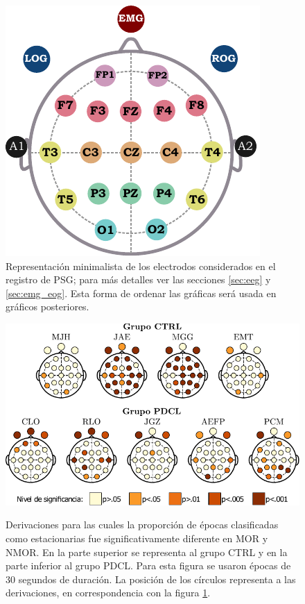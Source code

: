 \documentclass[12pt,letterpaper]{book}
\begin{document}
\begin{figure}
\centering
\includegraphics[scale=1.2]
{./img_diagramas/estampa_v1.pdf}
\caption{Representación minimalista de los electrodos considerados en el registro de PSG;
para más detalles ver las secciones \ref{sec:eeg} y \ref{sec:emg_eog}.
Esta forma de ordenar las gráficas será usada en gráficos posteriores.}
\label{img:estampa}
\end{figure}

\begin{figure}
\centering
\includegraphics[width=\textwidth]{./img_art_dfa/prop_tabla.pdf} \\
\caption{Derivaciones para las cuales la proporción de épocas clasificadas como estacionarias fue significativamente diferente en MOR y NMOR.
%
En la parte superior se representa al grupo CTRL y en la parte inferior al grupo PDCL.
%
Para esta figura se usaron épocas de 30 segundos de duración.
%
La posición de los círculos representa a las derivaciones, en correspondencia con la figura \ref{img:estampa}.}
\label{cabeza_new}
\end{figure}
\end{document}
